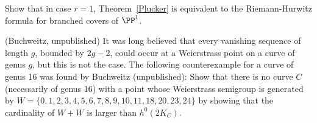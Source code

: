\begin{exercise}
Show that in case $r=1$, Theorem~\ref{Plucker} is equivalent to the Riemann-Hurwitz formula for branched covers of $\PP^1$.
\end{exercise}

\begin{exercise}(Buchweitz, unpublished)
It was long believed that every vanishing sequence of length $g$, bounded by $2g-2$, could occur at a Weierstrass
point on a curve of genus $g$, but this is not the case. The following counterexample for a curve of genus 16 was found by Buchweitz (unpublished): Show that there is no curve $C$ (necessarily of genus 16) with a point whose Weierstrass semigroup
is generated by
$W =\{0,1,2,3,4,5,6,7,8,9,10,11, 18,20,23,24\}$
by showing that the cardinality of $W+W$ is larger than $h^0(2K_C)$.
\end{exercise}

